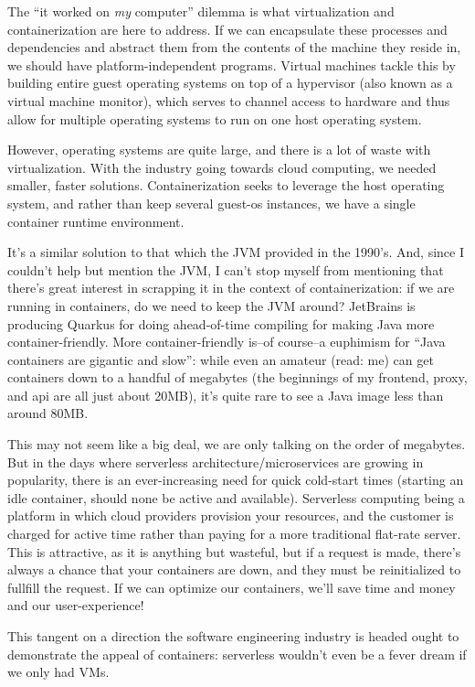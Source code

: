 \documentclass[11pt, twoside, reqno]{book}
\begin{document}
The ``it worked on \textit{my} computer'' dilemma is what virtualization and containerization are here to address. If we can encapsulate these processes and dependencies and abstract them from the contents of the machine they reside in, we should have platform-independent programs. Virtual machines tackle this by building entire guest operating systems on top of a hypervisor (also known as a virtual machine monitor), which serves to channel access to hardware and thus allow for multiple operating systems to run on one host operating system.

However, operating systems are quite large, and there is a lot of waste with virtualization. With the industry going towards cloud computing, we needed smaller, faster solutions. Containerization seeks to leverage the host operating system, and rather than keep several guest-os instances, we have a single container runtime environment.

It's a similar solution to that which the JVM provided in the 1990's. And, since I couldn't help but mention the JVM, I can't stop myself from mentioning that there's great interest in scrapping it in the context of containerization: if we are running in containers, do we need to keep the JVM around? JetBrains is producing Quarkus for doing ahead-of-time compiling for making Java more container-friendly. More container-friendly is--of course--a euphimism for ``Java containers are gigantic and slow'': while even an amateur (read: me) can get containers down to a handful of megabytes (the beginnings of my frontend, proxy, and api are all just about 20MB), it's quite rare to see a Java image less than around 80MB.

This may not seem like a big deal, we are only talking on the order of megabytes. But in the days where serverless architecture/microservices are growing in popularity, there is an ever-increasing need for quick cold-start times (starting an idle container, should none be active and available). Serverless computing being a platform in which cloud providers provision your resources, and the customer is charged for active time rather than paying for a more traditional flat-rate server. This is attractive, as it is anything but wasteful, but if a request is made, there's always a chance that your containers are down, and they must be reinitialized to fullfill the request. If we can optimize our containers, we'll save time and money and our user-experience!

This tangent on a direction the software engineering industry is headed ought to demonstrate the appeal of containers: serverless wouldn't even be a fever dream if we only had VMs.
\end{document}
